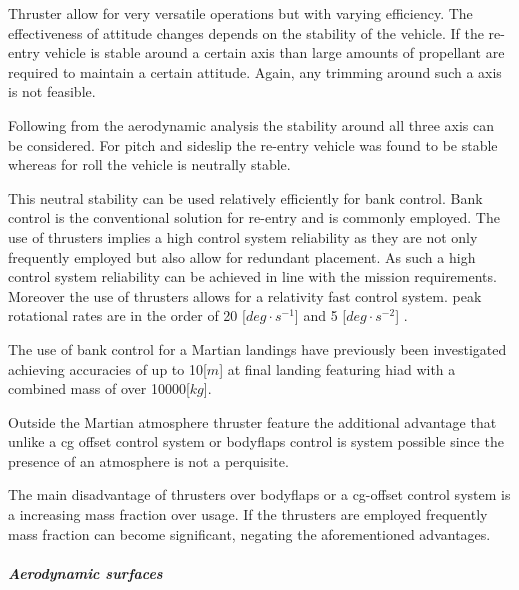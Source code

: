 Thruster allow for very versatile operations but with varying efficiency. The effectiveness of attitude changes depends on the stability of the vehicle. If the re-entry vehicle is stable around a certain axis than large amounts of propellant are required to maintain a certain attitude. Again, any trimming around such a axis is not feasible.

Following from the aerodynamic analysis the stability around all three axis can be considered. For pitch and sideslip the re-entry vehicle was found to be stable whereas for roll the vehicle is neutrally stable. 

This neutral stability can be used relatively efficiently for bank control. Bank control is the conventional solution for re-entry and is commonly employed. The use of thrusters implies a high control system reliability \cite{Wertz2011} as they are not only frequently employed but also allow for redundant placement. As such a high control system reliability can be achieved in line with the mission requirements. Moreover the use of thrusters allows for a relativity fast control system. peak rotational rates are in the order of 20 [$deg\cdot s^{-1}$] and 5 [$deg \cdot s^{-2}$] \cite{Davis2010}.

The use of bank control for a Martian landings have previously been investigated \cite{Davis2010} achieving accuracies of up to 10[$m$] at final landing featuring \gls{hiad} with a combined mass of over 10000[$kg$].

Outside the Martian atmosphere thruster feature the additional advantage that unlike a \gls{cg} offset control system or bodyflaps control is system possible since the presence of an atmosphere is not a perquisite.

The main disadvantage of thrusters over bodyflaps or a \gls{cg}-offset control system is a increasing mass fraction over usage. If the thrusters are employed frequently mass fraction can become significant, negating the aforementioned advantages.


\subparagraph{Aerodynamic surfaces}

